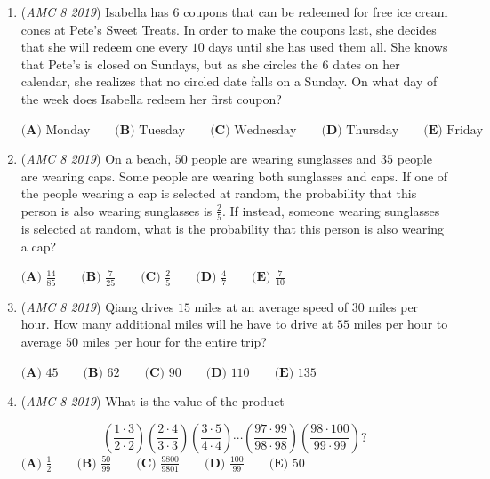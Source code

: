 \begin{enumerate}
 $\textbf{(A) }2\qquad\textbf{(B) }3\qquad\textbf{(C) }4\qquad\textbf{(D) }5\qquad\textbf{(E) }6$


	\item (\textit{AMC 8 2019}) Isabella has $6$ coupons that can be redeemed for free ice cream cones at Pete's Sweet Treats. In order to make the coupons last, she decides that she will redeem one every $10$ days until she has used them all. She knows that Pete's is closed on Sundays, but as she circles the $6$ dates on her calendar, she realizes that no circled date falls on a Sunday. On what day of the week does Isabella redeem her first coupon?


 $\textbf{(A) }\text{Monday}\qquad\textbf{(B) }\text{Tuesday}\qquad\textbf{(C) }\text{Wednesday}\qquad\textbf{(D) }\text{Thursday}\qquad\textbf{(E) }\text{Friday}$


	\item (\textit{AMC 8 2019}) On a beach, $50$ people are wearing sunglasses and $35$ people are wearing caps. Some people are wearing both sunglasses and caps. If one of the people wearing a cap is selected at random, the probability that this person is also wearing sunglasses is $\frac{2}{5}$. If instead, someone wearing sunglasses is selected at random, what is the probability that this person is also wearing a cap?


 $\textbf{(A) }\frac{14}{85}\qquad\textbf{(B) }\frac{7}{25}\qquad\textbf{(C) }\frac{2}{5}\qquad\textbf{(D) }\frac{4}{7}\qquad\textbf{(E) }\frac{7}{10}$


	\item (\textit{AMC 8 2019}) Qiang drives $15$ miles at an average speed of $30$ miles per hour. How many additional miles will he have to drive at $55$ miles per hour to average $50$ miles per hour for the entire trip?


 $\textbf{(A) }45\qquad\textbf{(B) }62\qquad\textbf{(C) }90\qquad\textbf{(D) }110\qquad\textbf{(E) }135$


	\item (\textit{AMC 8 2019}) What is the value of the product 


 
 \[\left(\frac{1\cdot3}{2\cdot2}\right)\left(\frac{2\cdot4}{3\cdot3}\right)\left(\frac{3\cdot5}{4\cdot4}\right)\cdots\left(\frac{97\cdot99}{98\cdot98}\right)\left(\frac{98\cdot100}{99\cdot99}\right)?\]
$\textbf{(A) }\frac{1}{2}\qquad\textbf{(B) }\frac{50}{99}\qquad\textbf{(C) }\frac{9800}{9801}\qquad\textbf{(D) }\frac{100}{99}\qquad\textbf{(E) }50$



\end{enumerate}
